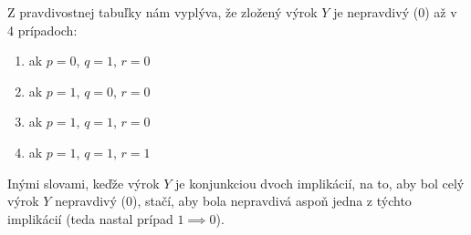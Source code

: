 \documentclass{article}
\begin{document}
\vspace{5mm}
Z pravdivostnej tabuľky nám vyplýva, že zložený výrok $Y$ je nepravdivý (0) až v 4 prípadoch:
\begin{enumerate}[label=\alph*)]
    \item ak $p = 0$, $q = 1$, $r = 0$
    \item ak $p = 1$, $q = 0$, $r = 0$
    \item ak $p = 1$, $q = 1$, $r = 0$
    \item ak $p = 1$, $q = 1$, $r = 1$
\end{enumerate}
\vspace{5mm}
Inými slovami, keďže výrok $Y$ je konjunkciou dvoch implikácií, na to, aby bol celý výrok $Y$ nepravdivý (0), stačí, aby bola nepravdivá aspoň jedna z týchto implikácií (teda nastal prípad $1 \implies 0$).

\bigskip
\end{document}
